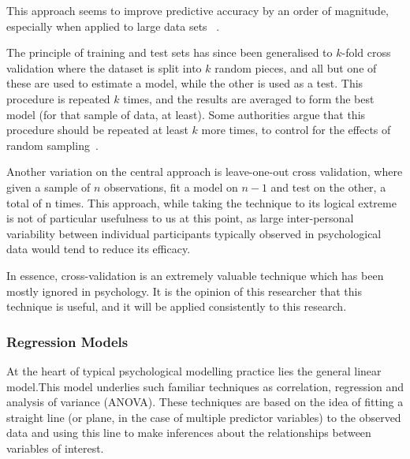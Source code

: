 This approach seems to improve predictive accuracy by an order of  magnitude, especially when applied to large data sets ~\cite{breiman2001statistical}.  

The principle of training and test sets has since been generalised to $k$-fold cross validation where the dataset is split into $k$ random pieces, and all but one of these are used to estimate a model, while the other is used as a test. This procedure is repeated $k$ times, and the results are averaged to form the best model (for that sample of data, at least). Some authorities argue that this procedure should be repeated at least $k$ more times, to control for the effects of random sampling~\cite{friedman2009elements}.

Another variation on the central approach is leave-one-out cross validation, where given a sample of $n$ observations, fit a model on $n-1$ and test on the other, a total of n times. This approach, while taking the technique to its logical extreme is not of particular usefulness to us at this point, as large inter-personal variability between individual participants typically observed in psychological data would tend to reduce its efficacy\cite{friedman2009elements}. %

In essence, cross-validation is an extremely valuable technique which has been mostly ignored in psychology. It is the opinion of this researcher  that this technique is useful, and it will be applied consistently to this research.

\subsubsection{Regression Models}
\label{sec:regress-models}

At the heart of typical psychological modelling practice lies the general linear model.This model underlies such familiar techniques as correlation, regression and analysis of variance (ANOVA)\cite{gelman2007data}. These techniques are based on the idea of fitting a straight line (or plane, in the case of multiple predictor variables) to the observed data and using this line to make inferences about the relationships between variables of interest.


